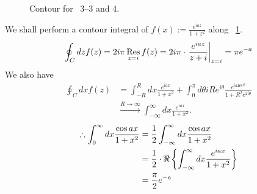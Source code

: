 \item

\begin{figure}[h]
	\centering
	\caption{Contour for ~3--3 and 4.}%
	\label{fig:problem3-3,4}
\end{figure}

We shall perform a contour integral of $f(x) := \frac{e^{iaz}}{1 + z^2}$ along ~\ref{fig:problem3-3,4}.
\[
	\oint_C dz f(z)
	= 2i\pi \mathop{\mathrm{Res}}_{z = i} f(z)
	= 2i\pi \cdot {\left. \frac{e^{iaz}}{z + i} \right|}_{z = i}
	= \pi e^{-a}
\]
We also have
\begin{align*}
	\oint_C dx f(z)
	&= \int_{-R}^{R} dx \frac{e^{iax}}{1 + x^2}
	 +\int_0^{\pi} d\theta iRe^{i\theta} \frac{e^{iaRe^{i\theta}}}{1 + R^2 e^{2i\theta}} \\
	& \xrightarrow{R \rightarrow \infty} \int_{-\infty}^{\infty} dx \frac{e^{iax}}{1 + x^2}.
\end{align*}
\begin{align*}
	\therefore \int_{0}^{\infty} dx \frac{\cos ax}{1 + x^2}
	&= \frac{1}{2} \int_{-\infty}^{\infty} dx \frac{\cos ax}{1 + x^2} \\
	&= \frac{1}{2} \cdot \Re \left\{ \int_{-\infty}^{\infty} dx \frac{e^{iax}}{1 + x^2} \right\} \\
	&= \frac{\pi}{2} e^{-a}
\end{align*}